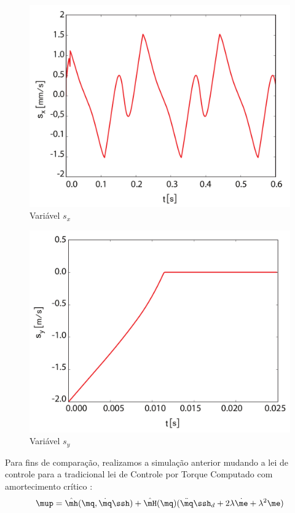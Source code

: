 \documentclass[]{politex}
\begin{document}
\begin{multicols}{2}
\begin{figure}[H]
	\centering
	\includegraphics[scale=0.31]{../figures/sx2.pdf}  
	\caption{Variável $s_x$}
	\label{fig:sx2}
\end{figure}
\begin{figure}[H]
	\centering
	\includegraphics[scale=0.31]{../figures/sy2.pdf}  
	\caption{Variável $s_y$}
	\label{fig:sy2}
\end{figure}
\end{multicols}

Para fins de comparação, realizamos a simulação anterior mudando a lei de controle para a tradicional lei de Controle por Torque Computado com amortecimento crítico \cite{Craig}:
\begin{equation}
\mup = \hat{\mh}(\mq,\dot{\mq}\ssh) + \hat{\mH}(\mq)( \ddot{\mq}\ssh_d + 2 \lambda \dot{\me} + \lambda^2 \me )
\end{equation}
\end{document}
